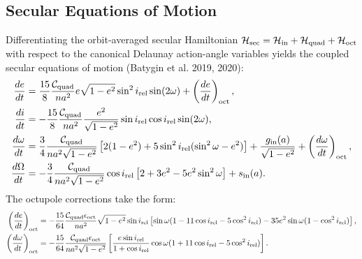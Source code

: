 \documentclass[11pt,a4paper]{article}
\begin{document}
\subsection{Secular Equations of Motion}
Differentiating the orbit-averaged secular Hamiltonian $\mathcal{H}_{\rm sec} = \mathcal{H}_{\rm in} + \mathcal{H}_{\rm quad} + \mathcal{H}_{\rm oct}$ with respect to the canonical Delaunay action-angle variables yields the coupled secular equations of motion (Batygin et al. 2019, 2020):
\begin{align}
\frac{de}{dt} &= \frac{15}{8} \frac{\mathcal{C}_{\rm quad}}{n a^2} e \sqrt{1 - e^2} \sin^2 i_{\rm rel} \sin(2\omega) + \left(\frac{de}{dt}\right)_{\rm oct}, \\
\frac{di}{dt} &= -\frac{15}{8} \frac{\mathcal{C}_{\rm quad}}{n a^2} \frac{e^2}{\sqrt{1 - e^2}} \sin i_{\rm rel} \cos i_{\rm rel} \sin(2\omega), \\
\frac{d\omega}{dt} &= \frac{3}{4} \frac{\mathcal{C}_{\rm quad}}{n a^2 \sqrt{1 - e^2}} \left[ 2(1 - e^2) + 5 \sin^2 i_{\rm rel} (\sin^2\omega - e^2) \right] + \frac{g_{\rm in}(a)}{\sqrt{1 - e^2}} + \left(\frac{d\omega}{dt}\right)_{\rm oct}, \\
\frac{d\Omega}{dt} &= -\frac{3}{4} \frac{\mathcal{C}_{\rm quad}}{n a^2 \sqrt{1 - e^2}} \cos i_{\rm rel} \left[ 2 + 3e^2 - 5e^2 \sin^2\omega \right] + s_{\rm in}(a).
\end{align}
The octupole corrections take the form:
\begin{align}
\left(\frac{de}{dt}\right)_{\rm oct} &= -\frac{15}{64} \frac{\mathcal{C}_{\rm quad} \epsilon_{\rm oct}}{n a^2} \sqrt{1 - e^2} \sin i_{\rm rel} \left[ \sin\omega (1 - 11\cos i_{\rm rel} - 5\cos^2 i_{\rm rel}) - 35 e^2 \sin\omega (1 - \cos^2 i_{\rm rel}) \right], \\
\left(\frac{d\omega}{dt}\right)_{\rm oct} &= -\frac{15}{64} \frac{\mathcal{C}_{\rm quad} \epsilon_{\rm oct}}{n a^2 \sqrt{1 - e^2}} \left[ \frac{e \sin i_{\rm rel}}{1 + \cos i_{\rm rel}} \cos\omega (1 + 11\cos i_{\rm rel} - 5\cos^2 i_{\rm rel}) \right].
\end{align}
\end{document}

